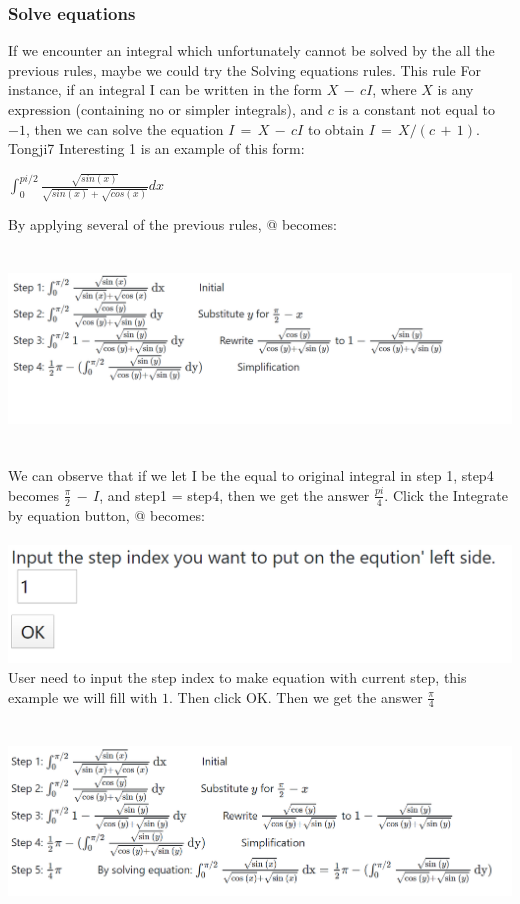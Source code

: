 \documentclass[titlepage]{article}
\makeatletter
\newcommand*{\rom}[1]{\expandafter\@slowromancap\romannumeral #1@}
\makeatother
\begin{document}
\subsubsection{Solve equations}
If we encounter an integral which unfortunately cannot be solved by the all the previous rules, maybe we could try the Solving equations rules. This rule For instance, if an integral I can be written
in the form $X\,−\,cI$, where $X$ is any expression (containing no or simpler integrals),
and $c$ is a constant not equal to $−1$, then we can solve the equation $I\, =\, X\, −\, cI$
to obtain $I\, =\, X/(c\, +\, 1)$. Tongji7 Interesting 1 is an example of this form:
\begin{center}
$\int_{0}^{pi/2} \frac{\sqrt{sin(x)}}{\sqrt{sin(x)} + \sqrt{cos(x)}} dx$
\end{center}
By applying several of the previous rules, \rom{3} becomes:\\
\includegraphics[width=14.5cm, height=6cm]{27.png}
We can observe that if we let I be the equal to original integral in step 1, step4 becomes $\frac{\pi}{2}\,-\,I$, and step1 = step4, then we get the answer $\frac{pi}{4}$. Click the \colorbox{mygray}{Integrate by equation} button, \rom{5} becomes:\\
\\
\includegraphics{28.png}\\
User need to input the step index to make equation with current step, this example we will fill with $1$. Then click \colorbox{mygray}{OK}. Then we get the answer $\frac{\pi}{4}$\\
\includegraphics[width=14.5cm, height=6cm]{29.png}
\end{document}
